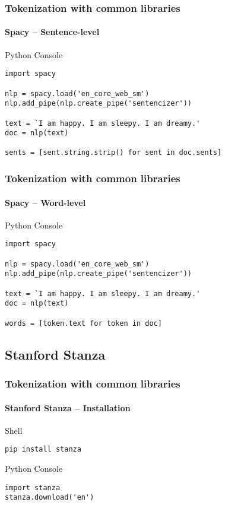 \documentclass{beamer}
\begin{document}
\begin{frame}[containsverbatim]
    \frametitle{Tokenization with common libraries}
    \framesubtitle{Spacy -- Sentence-level}
    \begin{block}{Python Console}
        \begin{lstlisting}
import spacy

nlp = spacy.load('en_core_web_sm')
nlp.add_pipe(nlp.create_pipe('sentencizer'))

text = `I am happy. I am sleepy. I am dreamy.' 
doc = nlp(text)

sents = [sent.string.strip() for sent in doc.sents]        
        \end{lstlisting}        
    \end{block}

\end{frame}

\begin{frame}[containsverbatim]
    \frametitle{Tokenization with common libraries}
    \framesubtitle{Spacy -- Word-level}
    \begin{block}{Python Console}
        \begin{lstlisting}
import spacy

nlp = spacy.load('en_core_web_sm')
nlp.add_pipe(nlp.create_pipe('sentencizer'))

text = `I am happy. I am sleepy. I am dreamy.' 
doc = nlp(text)

words = [token.text for token in doc]
        \end{lstlisting}    
    \end{block}

\end{frame}


\subsection{Stanford Stanza}
\begin{frame}[containsverbatim]
    \frametitle{Tokenization with common libraries}
    \framesubtitle{Stanford Stanza -- Installation}
    \begin{block}{Shell}
        \begin{lstlisting}
pip install stanza
        \end{lstlisting}    
    \end{block}
    
    \begin{block}{Python Console}
        \begin{lstlisting}
import stanza
stanza.download('en')
        \end{lstlisting}    
    \end{block}
\end{frame}
\end{document}
